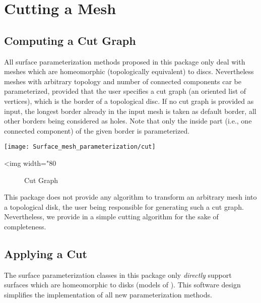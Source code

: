 \section{Cutting a Mesh \label{sec:Cutting-a-Mesh}}

\subsection{Computing a Cut Graph}

All surface parameterization methods proposed in this package only
deal with meshes which are homeomorphic (topologically equivalent) to discs.
Nevertheless meshes with arbitrary topology and number of connected components car be parameterized, provided that the user specifies a cut graph (an oriented list of vertices), which is the border of a topological disc. If no cut graph is
provided as input, the longest border already
in the input mesh is taken as default border, all other borders being considered as holes. Note that only the inside part (i.e., one connected component) of the given border is parameterized.

\begin{center}
    \label{Surface_mesh_parameterization-fig-cut}
    \begin{ccTexOnly}
        \texttt{[image: Surface\_mesh\_parameterization/cut]}
    \end{ccTexOnly}
    \begin{ccHtmlOnly}
        <img width="80%
    \end{ccHtmlOnly}
    \begin{figure}[h]
        \caption{Cut Graph}
    \end{figure}
\end{center}

This package does not provide any algorithm to transform an arbitrary mesh
into a topological disk, the user being responsible
for generating such a cut graph. Nevertheless, we provide in
 a simple cutting algorithm for
the sake of completeness.


\subsection{Applying a Cut}

The surface parameterization classes in this package only \emph{directly} support
 surfaces which are homeomorphic to disks (models of
). This software design simplifies the
implementation of all new parameterization methods.

